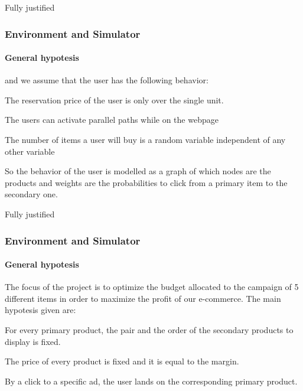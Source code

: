 \documentclass{beamer}
\begin{document}
\begin {frame} {Fully justified}

\frametitle{Environment and Simulator}
\framesubtitle{General hypotesis}

and we assume that the user has the following behavior:
\vspace{0.3cm}
\begin{list}{-}{\setlength{\itemsep}{0.3cm}}
    \item The reservation price of the user is only over the single unit.
    \item The users can activate parallel paths while on the webpage
    \item The number of items a user will buy is a random variable independent of any other variable
\end{list}
\vspace{0.3cm}

So the behavior of the user is modelled as a graph of which nodes are the products and weights are the probabilities to click from a primary item to the secondary one.

\end {frame}


\begin {frame} {Fully justified}

\frametitle{Environment and Simulator}
\framesubtitle{General hypotesis}

The focus of the project is to optimize the budget allocated to the campaign of 5 different items in order to maximize the profit of our e-commerce.
The main hypotesis given are:
\vspace{0.3cm}
\begin{list}{-}{\setlength{\itemsep}{0.3cm}}
    \item For every primary product, the pair and the order of the secondary products to display is fixed.
    \item The price of every product is fixed and it is equal to the margin.
    \item By a click to a specific ad, the user lands on the corresponding primary product.

\end{list}
\vspace{0.5cm}


\end {frame}

\end{document}
